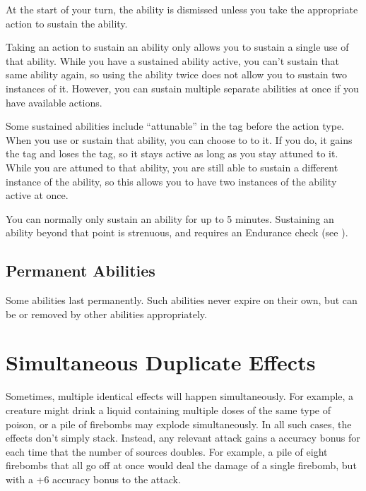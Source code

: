     At the start of your turn, the ability is dismissed unless you take the appropriate action to sustain the ability.

    Taking an action to sustain an ability only allows you to sustain a single use of that ability.
    While you have a sustained ability active, you can't sustain that same ability again, so using the ability twice does not allow you to sustain two instances of it.
    However, you can sustain multiple separate abilities at once if you have available actions.

    Some sustained abilities include ``attunable'' in the tag before the action type.
    When you use or sustain that ability, you can choose to  to it.
    If you do, it gains the  tag and loses the  tag, so it stays active as long as you stay attuned to it.
    While you are attuned to that ability, you are still able to sustain a different instance of the ability, so this allows you to have two instances of the ability active at once.

    You can normally only sustain an ability for up to 5 minutes.
    Sustaining an ability beyond that point is strenuous, and requires an Endurance check (see ).

  \subsection{Permanent Abilities}
    Some abilities last permanently.
    Such abilities never expire on their own, but can be  or removed by other abilities appropriately.

\section{Simultaneous Duplicate Effects}
  Sometimes, multiple identical effects will happen simultaneously.
  For example, a creature might drink a liquid containing multiple doses of the same type of poison, or a pile of firebombs may explode simultaneously.
  In all such cases, the effects don't simply stack.
  Instead, any relevant attack gains a  accuracy bonus for each time that the number of sources doubles.
  For example, a pile of eight firebombs that all go off at once would deal the damage of a single firebomb, but with a +6 accuracy bonus to the attack.
